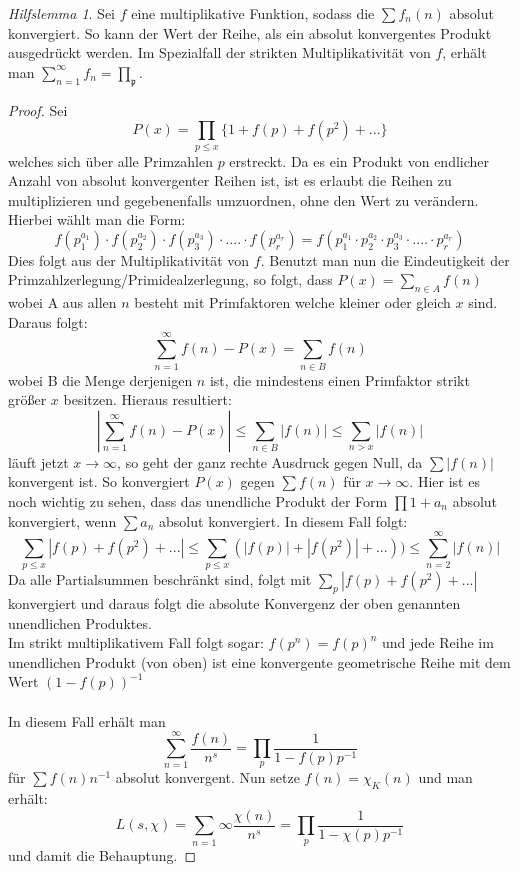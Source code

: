 \documentclass[10pt,a4paper]{article}
\theoremstyle{plain}
\theoremstyle{definition}
\theoremstyle{remark}
\newtheorem{hilfslem}{Hilfslemma}
\begin{document}
 \begin{hilfslem}\label{hilfslemma3}
Sei $f$ eine multiplikative Funktion, sodass die $\sum f_n(n)$ absolut konvergiert. So kann der Wert der Reihe, als ein absolut konvergentes Produkt ausgedrückt werden. Im Spezialfall der strikten Multiplikativität von $f$, erhält man $\sum_{n=1}^{\infty}f_n=\prod_{\mathfrak{p}}$.

\begin{proof}

Sei $$P(x)= \prod_{p\leq x}\{1+f(p)+f(p^2)+...\}$$welches sich über alle Primzahlen $p$ erstreckt. Da es ein Produkt von endlicher Anzahl von absolut konvergenter Reihen ist, ist es erlaubt die Reihen zu multiplizieren und gegebenenfalls umzuordnen, ohne den Wert zu verändern. Hierbei wählt man die Form:
$$f(p_1^{a_1})\cdot f(p_2^{a_2})\cdot f(p_3^{a_3})\cdot....\cdot f(p_{r}^{a_r})=f(p_{1}^{a_1}\cdot p_{2}^{a_2}\cdot p_{3}^{a_3}\cdot ....\cdot p_{r}^{a_r})$$Dies folgt aus der Multiplikativität von $f$. Benutzt man nun die Eindeutigkeit der Primzahlzerlegung/Primidealzerlegung, so folgt, dass $P(x)=\sum_{n \in A}f(n)$ wobei A aus allen $n$ besteht mit Primfaktoren welche kleiner oder gleich $x$  sind. Daraus folgt: $$\sum_{n=1}^{\infty}f(n)-P(x)= \sum_{n \in B}f(n)$$wobei B die Menge derjenigen $n$ ist, die mindestens einen Primfaktor strikt größer $x$ besitzen. Hieraus resultiert:$$|\sum_{n=1}^{\infty}f(n)-P(x)|\leq\sum_{n \in B}|f(n)|\leq\sum_{n > x}|f(n)|$$läuft jetzt $x\to\infty$, so geht der ganz rechte Ausdruck gegen Null, da $\sum|f(n)|$ konvergent ist. So konvergiert $P(x)$ gegen $\sum f(n)$ für $x \to \infty$. Hier ist es noch wichtig zu sehen, dass das unendliche Produkt der Form $\prod1+a_n$ absolut konvergiert, wenn $\sum a_n$ absolut konvergiert. In diesem Fall folgt:$$\sum_{p\leq x}|f(p)+f(p^2)+...| \leq \sum_{p \leq x}(|f(p)|+|f(p^2)|+...))\leq \sum_{n=2}^{\infty}|f(n)|$$Da alle Partialsummen beschränkt sind, folgt mit $\sum_{p}|f(p)+f(p^2)+...|$ konvergiert und daraus folgt die absolute Konvergenz der oben genannten unendlichen Produktes.
\\
Im strikt multiplikativem Fall folgt sogar: $f(p^n)=f(p)^n$ und jede Reihe im unendlichen Produkt (von oben) ist eine konvergente geometrische Reihe mit dem Wert $(1-f(p))^{-1}$
\\
\\
In diesem Fall  erhält man $$\sum_{n=1}^{\infty}\frac{f(n)}{n^s}=\prod_{p}\frac{1}{1-f(p)p^{-1}}$$ für $\sum f(n)n^{-1}$ absolut konvergent. Nun setze  $f(n)=\chi_K(n)$ und man erhält:$$L(s,\chi)=\sum_{n=1}{\infty}\frac{\chi(n)}{n^s}=\prod_{p}\frac{1}{1-\chi(p)p^{-1}}$$und damit die Behauptung.

\end{proof}
\end{hilfslem}
\end{document}
